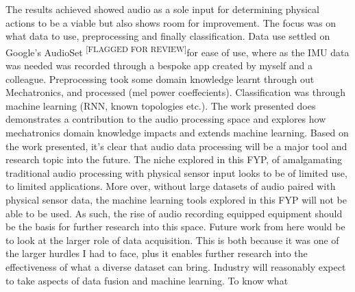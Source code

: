 \documentclass{UoNMCHA}
\newcommand{\flagforreview}{\textsuperscript{\color{red} [FLAGGED FOR REVIEW]}}
\numberwithin{equation}{section}
\begin{document}
The results achieved showed audio as a sole input for determining physical actions to be a viable but also shows room for improvement. The focus was on what data to use, preprocessing and finally classification. 
Data use settled on Google's AudioSet \flagforreview for ease of use, where as the IMU data was needed was recorded through a bespoke app created by myself and a colleague. Preprocessing took some domain knowledge learnt through out Mechatronics, and processed (mel power coeffecients). Classification was through machine learning (RNN, known topologies etc.). 
The work presented does demonstrates a contribution to the audio processing space and explores how mechatronics domain knowledge impacts and extends machine learning.
Based on the work presented, it's clear that audio data processing will be a major tool and research topic into the future. The niche explored in this FYP, of amalgamating traditional audio processing with physical sensor input looks to be of limited use, to limited applications. More over, without large datasets of audio paired with physical sensor data, the machine learning tools explored in this FYP will not be able to be used. As such, the rise of audio recording equipped equipment should be the basis for further research into this space. 
Future work from here would be to look at the larger role of data acquisition. This is both because it was one of the larger hurdles I had to face, plus it enables further research into the effectiveness of what a diverse dataset can bring. Industry will reasonably expect to take aspects of data fusion and machine learning. To know what
\end{document}
